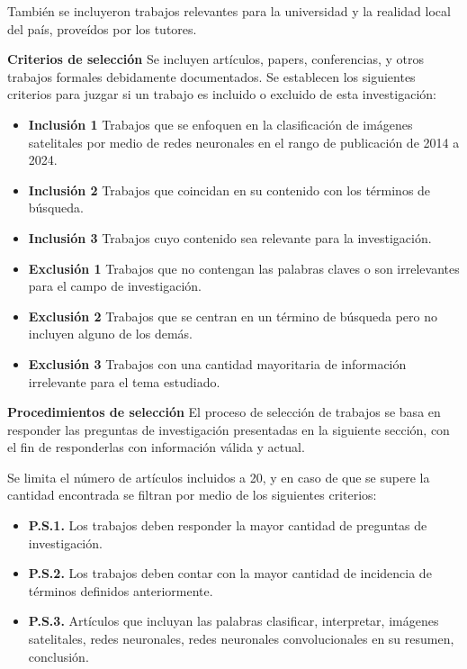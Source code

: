 También se incluyeron trabajos relevantes para la universidad y la realidad local del país, proveídos por los tutores.

{\bf Criterios de selección} Se incluyen artículos, papers, conferencias, y otros trabajos formales debidamente
documentados. Se establecen los siguientes criterios para juzgar si un trabajo es incluido o excluido de esta
investigación:

\vspace{-\topsep}
\begin{itemize}
    \setlength{\parskip}{0pt}
    \setlength{\itemsep}{0pt plus 1pt}
    \item[] {\bf Inclusión 1} Trabajos que se enfoquen en la clasificación de imágenes satelitales por medio de redes
        neuronales en el rango de publicación de 2014 a 2024.
    \item[] {\bf Inclusión 2} Trabajos que coincidan en su contenido con los términos de búsqueda.
    \item[] {\bf Inclusión 3} Trabajos cuyo contenido sea relevante para la investigación.
    \item[] {\bf Exclusión 1} Trabajos que no contengan las palabras claves o son irrelevantes para el campo de
        investigación.
    \item[] {\bf Exclusión 2} Trabajos que se centran en un término de búsqueda pero no incluyen alguno de los demás.
    \item[] {\bf Exclusión 3} Trabajos con una cantidad mayoritaria de información irrelevante para el tema estudiado.
\end{itemize}
\vspace{-\topsep}

{\bf Procedimientos de selección} El proceso de selección de trabajos se basa en responder las preguntas de
investigación presentadas en la siguiente sección, con el fin de responderlas con información válida y actual.

Se limita el número de artículos incluidos a 20, y en caso de que se supere la cantidad encontrada se filtran por medio
de los siguientes criterios:

\begin{itemize}
    \item[] {\bf P.S.1.} Los trabajos deben responder la mayor cantidad de preguntas de investigación.
    \item[] {\bf P.S.2.} Los trabajos deben contar con la mayor cantidad de incidencia de términos definidos
        anteriormente.
    \item[] {\bf P.S.3.} Artículos que incluyan las palabras clasificar, interpretar, imágenes satelitales, redes
        neuronales, redes neuronales convolucionales en su resumen, conclusión.
\end{itemize}

